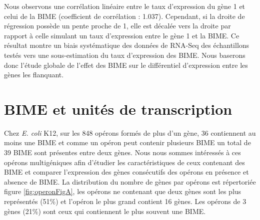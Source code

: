 \documentclass[12pt,a4paper]{report}
\begin{document}
\begin{onehalfspace}
Nous observons une corrélation linéaire entre le taux d'expression du gène 1 et celui de la BIME (coefficient de corrélation : 1.037). Cependant, si la droite de régression possède un pente proche de 1, elle est décalée vers la droite par rapport à celle simulant un taux d'expression entre le gène 1 et la BIME. Ce résultat montre un biais systématique des données de RNA-Seq des échantillons testés vers une sous-estimation du taux d'expression des BIME. Nous baserons donc l'étude globale de l'effet des BIME sur le différentiel d'expression entre les gènes les flanquant.

\section*{BIME et unités de transcription}

Chez \textit{E. coli} K12, sur les 848 opérons formés de plus d'un gène, 36 contiennent au moins une BIME et comme un opéron peut contenir plusieurs BIME un total de 39 BIME sont présentes entre deux gènes. Nous nous sommes intéressés à ces opérons multigéniques afin d'étudier les caractéristiques de ceux contenant des BIME et comparer l'expression des gènes consécutifs des opérons en présence et absence de BIME. La distribution du nombre de gènes par opérons est répertoriée figure \autoref{fig:operonFigA}, les opérons ne contenant que deux gènes sont les plus représentés (51\%) et l'opéron le plus grand contient 16 gènes. Les opérons de 3 gènes (21\%) sont ceux qui contiennent le plus souvent une BIME.


\end{onehalfspace}
\end{document}
